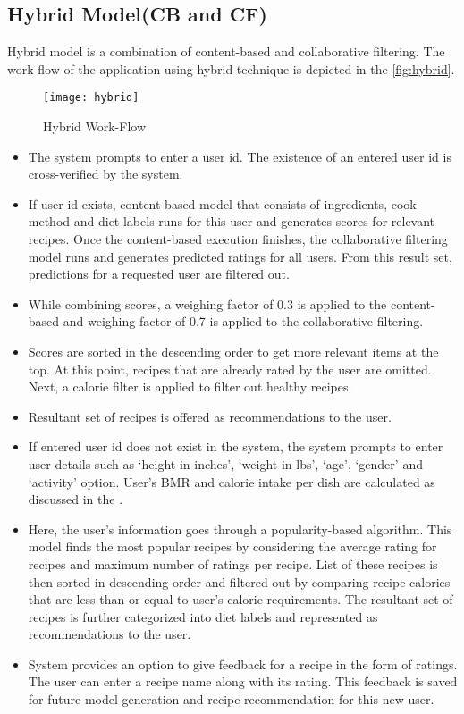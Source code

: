\subsection{Hybrid Model(CB and CF)}
\label{sec:hybrid_impl}
Hybrid model is a combination of content-based and collaborative filtering. The work-flow of the application using hybrid technique is depicted in the \autoref{fig:hybrid}.
\begin{singlespace}
\begin{figure}[H]
	\centering
	\texttt{[image: hybrid]}
	\caption{Hybrid Work-Flow }
	\label{fig:hybrid}
\end{figure}  
\end{singlespace}
\begin{itemize}
\item The system prompts to enter a user id. The existence of an entered user id is cross-verified by the system.
\item If user id exists, content-based model that consists of ingredients, cook method and diet labels runs for this user and generates scores for relevant recipes. Once the content-based execution finishes, the collaborative filtering model runs and generates predicted ratings for all users. From this result set, predictions for a requested user are filtered out. 
\item While combining scores, a weighing factor of 0.3 is applied to the content-based and weighing factor of 0.7 is applied to the collaborative filtering.
\item Scores are sorted in the descending order to get more relevant items at the top. At this point, recipes that are already rated by the user are omitted. Next, a calorie filter is applied to filter out healthy recipes.
\item Resultant set of recipes is offered as recommendations to the user.
\item If entered user id does not exist in the system, the system prompts to enter user details such as \lq{}height in inches\rq{}, \lq{}weight in lbs\rq{}, \lq{}age\rq{}, \lq{}gender\rq{} and \lq{}activity\rq{} option. User's BMR and calorie intake per dish are calculated as discussed in the . 
\item Here, the user's information goes through a popularity-based algorithm. This model finds the most popular recipes by considering the average rating for recipes and maximum number of ratings per recipe. List of these recipes is then sorted in descending order and filtered out by comparing recipe calories that are less than or equal to user's calorie requirements. The resultant set of recipes is further categorized into diet labels and represented as recommendations to the user.
\item System provides an option to give feedback for a recipe in the form of ratings. The user can enter a recipe name along with its rating. This feedback is saved for future model generation and recipe recommendation for this new user.
\end{itemize}
